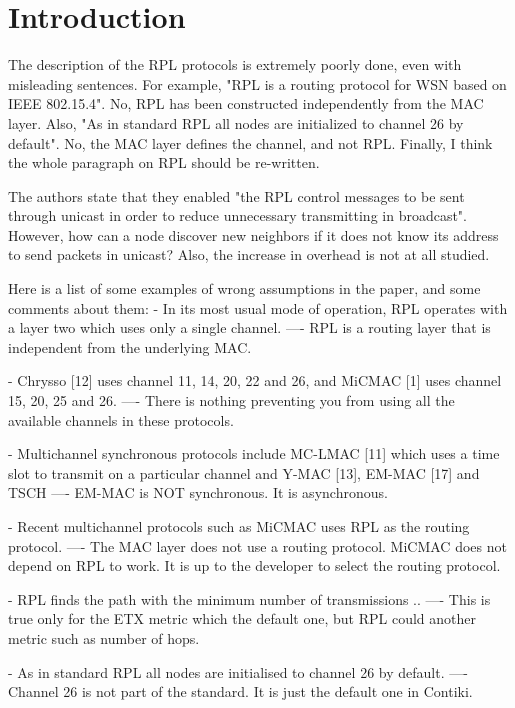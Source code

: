 \section{Introduction}
\label{sec:introduction}

The description of the RPL protocols is extremely poorly done, even with misleading sentences. For example, "RPL is a routing protocol for WSN based on IEEE 802.15.4". No, RPL has been constructed independently from the MAC layer. Also, "As in standard RPL all nodes are initialized to channel 26 by default". No, the MAC layer defines the channel, and not RPL. Finally, I think the whole paragraph on RPL should be re-written.

The authors state that they enabled "the RPL control messages to be sent through unicast in order to reduce unnecessary transmitting in broadcast". However, how can a node discover new neighbors if it does not know its address to send packets in unicast? Also, the increase in overhead is not at all studied. 

Here is a list of some examples of wrong assumptions in the paper, and some comments about them: 
- In its most usual mode of operation, RPL operates with a layer two which uses only a single channel.
—- RPL is a routing layer that is independent from the underlying MAC.

- Chrysso [12] uses channel 11, 14, 20, 22 and 26, and MiCMAC [1] uses channel 15, 20, 25 and 26.
—- There is nothing preventing you from using all the available channels in these protocols.

- Multichannel synchronous protocols include MC-LMAC [11] which uses a time slot to transmit on a particular channel and Y-MAC [13], EM-MAC [17] and TSCH
—- EM-MAC is NOT synchronous. It is asynchronous.

- Recent multichannel protocols such as MiCMAC uses RPL as the routing protocol.
—- The MAC layer does not use a routing protocol. MiCMAC does not depend on RPL to work. It is up to the developer to select the routing protocol.

- RPL finds the path with the minimum number of transmissions ..
—- This is true only for the ETX metric which the default one, but RPL could another metric such as number of hops.

- As in standard RPL all nodes are initialised to channel 26 by default.
—- Channel 26 is not part of the standard. It is just the default one in Contiki.

